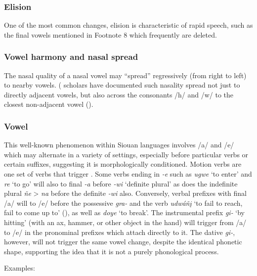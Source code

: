 \documentclass[output=paper]{LSP/langsci}
\begin{document}
\subsubsection{Elision}  One of the most common changes, elision is characteristic of rapid speech, such as the final vowels mentioned in Footnote 8 which frequently are deleted.  			

\subsubsection{Vowel harmony and nasal spread}  The nasal quality of a nasal vowel may ``spread'' regressively (from right to left) to nearby vowels.  ( scholars have documented such nasality spread not just to directly adjacent vowels, but also across the consonants /h/ and /w/ to the closest non-adjacent vowel  (\citealt[7--8]{HelmbrechtLehmann2010}).  

\subsubsection{Vowel }  This well-known phenomenon within Siouan languages involves /a/ and /e/ which may alternate in a variety of settings, especially before particular verbs or certain suffixes, suggesting it is morphologically conditioned.  Motion verbs are one set of verbs that trigger .  Some verbs ending in \textit{-e} such as \textit{ugwe} `to enter' and \textit{re} `to go' will also  to final \textit{-a}  before \textit{-wi} `definite plural' as does the indefinite plural \textit{ñe} > \textit{na} before the definite \textit{-wi} also.  Conversely, verbal prefixes with final /a/ will  to /e/ before the possessive \textit{gra-} and the verb \textit{udwáñ\k{i}} `to fail to reach, fail to come up to' (\citealt[239-40]{Whitman1947}), as well as \textit{doye} `to break'.  The instrumental prefix \textit{gi-} `by hitting' (with an ax, hammer, or other object in the hand) will trigger  from /a/ to /e/ in the pronominal prefixes which attach directly to it.  The dative \textit{gi-}, however, will not trigger the same vowel change, despite the identical phonetic shape, supporting the idea that it is not a purely phonological process.  

Examples:
\end{document}
